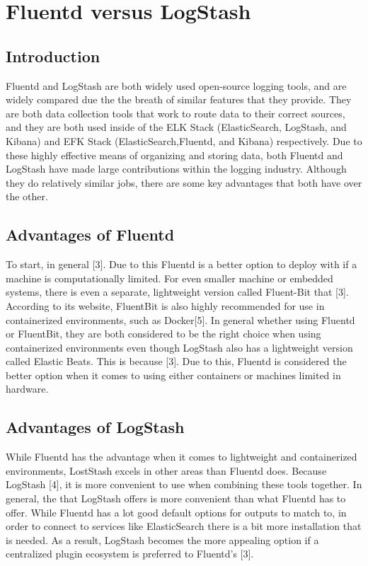 \section{Fluentd versus LogStash} \label{sec:comp}
\subsection{Introduction}
\quad \quad
Fluentd and LogStash are both widely used open-source logging tools, and are widely compared due the the breath of similar features that 
they provide. They are both data collection tools that work to route data to their correct sources, and they are both used inside of the 
ELK Stack (ElasticSearch, LogStash, and Kibana) and EFK Stack (ElasticSearch,Fluentd, and Kibana) respectively. Due to these highly effective means of organizing and storing data, both 
Fluentd and LogStash have made large contributions within the logging industry. Although they do relatively similar jobs, there are some key advantages that both have over the other.
\subsection{Advantages of Fluentd}
\quad \quad
To start, in general [3]. Due to this Fluentd is a better option to deploy with if a machine is
computationally limited. For even smaller machine or embedded systems, there is even a separate, lightweight version called Fluent-Bit that [3]. According to its website,
FluentBit is also highly recommended for use in containerized environments, such as Docker[5]. In general whether using Fluentd or FluentBit, they are both considered to be the right choice when using containerized environments even 
though LogStash also has a lightweight version called Elastic Beats. This is because [3].
Due to this, Fluentd is considered the better option when it comes to using either containers or machines limited in hardware.
\subsection{Advantages of LogStash}
\quad \quad
While Fluentd has the advantage when it comes to lightweight and containerized environments, LostStash excels in other areas than Fluentd does. Because LogStash [4], it 
is more convenient to use when combining these tools together. In general, the  that LogStash offers is more convenient than what Fluentd has to offer. While Fluentd has a lot good
default options for outputs to match to, in order to connect to services like ElasticSearch there is a bit more installation that is needed. As a result, LogStash becomes the more appealing option if a centralized plugin ecosystem is preferred to 
Fluentd's [3].
